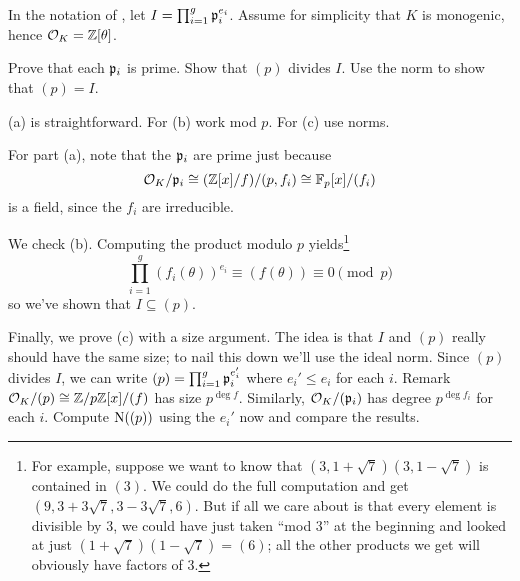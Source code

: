 \begin{problem}
	\label{prob:prove_factoring_algorithm}
	In the notation of , let $I = \prod_{i=1}^g \mathfrak p_i^{e_i}$.
	Assume for simplicity that $K$ is monogenic, hence $\mathcal O_K = \mathbb Z[\theta]$.
	\begin{enumerate}[(a)]
		\ii Prove that each $\mathfrak p_i$ is prime.
		\ii Show that $(p)$ divides $I$.
		\ii Use the norm to show that $(p) = I$.
	\end{enumerate}
	\begin{hint}
		(a) is straightforward.
		For (b) work mod $p$.
		For (c) use norms.
	\end{hint}
	\begin{sol}
	For part (a), note that the $\mathfrak p_i$ are prime
	just because
	\[ \mathcal O_K / \mathfrak p_i
		\cong (\mathbb Z[x] / f) / (p, f_i)
		\cong \mathbb F_p[x] / (f_i) \]
	is a field, since the $f_i$ are irreducible.

	We check (b).
		Computing the product modulo $p$ yields\footnote{%
			For example, suppose we want to know that $(3, 1+\sqrt{7})(3, 1-\sqrt{7})$ is contained in $(3)$.
			We could do the full computation and get $(9, 3+3\sqrt{7}, 3-3\sqrt{7}, 6)$.
			But if all we care about is that every element is divisible by $3$, we could have just taken ``mod $3$''
			at the beginning and looked at just $(1+\sqrt{7})(1-\sqrt{7}) = (6)$;
			all the other products we get will obviously have factors of $3$.
		}
		\[ \prod_{i=1}^{g} (f_i(\theta))^{e_i}
			\equiv (f(\theta)) \equiv 0 \pmod p \]
		so we've shown that $I \subseteq (p)$.

	Finally, we prove (c) with a size argument.
		The idea is that $I$ and $(p)$ really should have the same size;
		to nail this down we'll use the ideal norm.
		Since $(p)$ divides $I$, we can write
		$ (p) = \prod_{i=1}^g \mathfrak p_i^{e_i'} $
		where $e_i' \le e_i$ for each $i$.
		Remark $\mathcal O_K / (p) \cong \mathbb Z/p\mathbb Z[x] / (f)$ has size $p^{\deg f}$.
		Similarly, $\mathcal O_K / (\mathfrak p_i)$ has degree $p^{\deg f_i}$ for each $i$.
		Compute $\operatorname{N}( (p) )$ using the $e_i'$ now and compare the results.
	\end{sol}
\end{problem}
